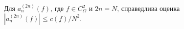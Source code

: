 \begin{lemma}
	\label{Lemma_af_est}Для $a_{n}^{(2n)}(f)$, где $f\in C_{\Omega}^{2}$ и $2n=N$, справедлива оценка $\left|a_{n}^{(2n)}(f)\right|\leq{c(f)}/{N^{2}}$.
\end{lemma}

